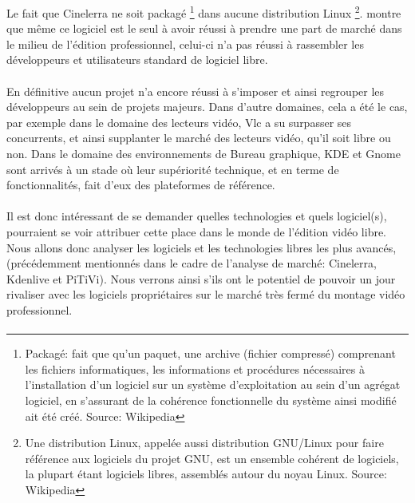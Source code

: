 
Le fait que Cinelerra ne soit packagé \footnote{Packagé: fait
que qu'un paquet, une archive (fichier compressé) comprenant les
fichiers informatiques, les informations et procédures nécessaires
à l'installation d'un logiciel sur un système d'exploitation au sein
d'un agrégat logiciel, en s'assurant de la cohérence fonctionnelle
du système ainsi modifié ait été créé. Source: Wikipedia} dans
aucune distribution Linux \footnote {Une distribution Linux, appelée
aussi distribution GNU/Linux pour faire référence aux logiciels du
projet GNU, est un ensemble cohérent de logiciels, la plupart étant
logiciels libres, assemblés autour du noyau Linux. Source: Wikipedia}.
montre que même ce logiciel est le seul à avoir réussi à prendre une
part de marché dans le milieu de l'édition professionnel, celui-ci n'a
pas réussi à rassembler les développeurs et utilisateurs standard de
logiciel libre.

\paragraph{}

En définitive aucun projet n'a encore réussi à s'imposer et ainsi
regrouper les développeurs au sein de projets majeurs. Dans d'autre
domaines, cela a été le cas, par exemple dans le domaine des lecteurs
vidéo, Vlc a su surpasser ses concurrents, et ainsi supplanter le
marché des lecteurs vidéo, qu'il soit libre ou non. Dans le domaine
des environnements de Bureau graphique, KDE et Gnome sont arrivés à un
stade où leur supériorité technique, et en terme de fonctionnalités,
fait d'eux des plateformes de référence.

\paragraph{}

Il est donc intéressant de se demander quelles technologies et quels
logiciel(s), pourraient se voir attribuer cette place dans le monde
de l'édition vidéo libre. Nous allons donc analyser les logiciels et
les technologies libres les plus avancés, (précédemment mentionnés
dans le cadre de l'analyse de marché: Cinelerra, Kdenlive et PiTiVi).
Nous verrons ainsi s'ils ont le potentiel de pouvoir un jour rivaliser
avec les logiciels propriétaires sur le marché très fermé du montage
vidéo professionnel.

\paragraph{}

